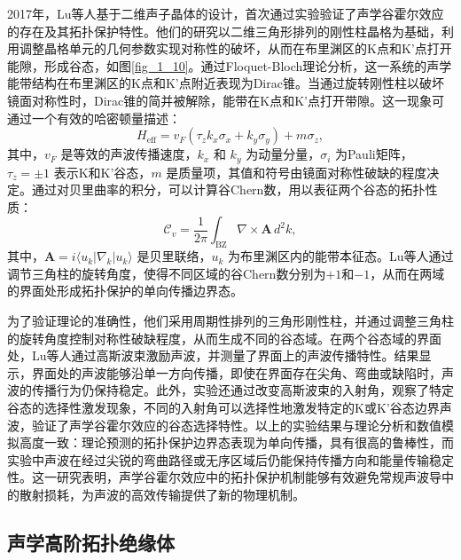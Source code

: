 2017年，Lu等人基于二维声子晶体的设计，首次通过实验验证了声学谷霍尔效应的存在及其拓扑保护特性\cite{i3}。他们的研究以二维三角形排列的刚性柱晶格为基础，利用调整晶格单元的几何参数实现对称性的破坏，从而在布里渊区的K点和K'点打开能隙，形成谷态，如图\ref{fig_1_10}。通过Floquet-Bloch理论分析，这一系统的声学能带结构在布里渊区的K点和K'点附近表现为Dirac锥。当通过旋转刚性柱以破坏镜面对称性时，Dirac锥的简并被解除，能带在K点和K'点打开带隙。这一现象可通过一个有效的哈密顿量描述：
\begin{equation} \label{eq1-13}
    H_{\text{eff}} = v_F (\tau_z k_x \sigma_x + k_y \sigma_y) + m \sigma_z,
\end{equation}
其中，\(v_F\) 是等效的声波传播速度，\(k_x\) 和 \(k_y\) 为动量分量，\(\sigma_i\) 为Pauli矩阵，\(\tau_z = \pm 1\) 表示K和K'谷态，\(m\) 是质量项，其值和符号由镜面对称性破缺的程度决定。通过对贝里曲率的积分，可以计算谷Chern数，用以表征两个谷态的拓扑性质：
\begin{equation} \label{eq1-14}
    \mathcal{C}_v = \frac{1}{2\pi} \int_{\text{BZ}} \nabla \times \mathbf{A} \, d^2k,
\end{equation}
其中，\(\mathbf{A} = i \langle u_k | \nabla_k | u_k \rangle\) 是贝里联络，\(u_k\) 为布里渊区内的能带本征态。Lu等人通过调节三角柱的旋转角度，使得不同区域的谷Chern数分别为\(+1\)和\(-1\)，从而在两域的界面处形成拓扑保护的单向传播边界态。

为了验证理论的准确性，他们采用周期性排列的三角形刚性柱，并通过调整三角柱的旋转角度控制对称性破缺程度，从而生成不同的谷态域。在两个谷态域的界面处，Lu等人通过高斯波束激励声波，并测量了界面上的声波传播特性。结果显示，界面处的声波能够沿单一方向传播，即使在界面存在尖角、弯曲或缺陷时，声波的传播行为仍保持稳定。此外，实验还通过改变高斯波束的入射角，观察了特定谷态的选择性激发现象，不同的入射角可以选择性地激发特定的K或K'谷态边界声波，验证了声学谷霍尔效应的谷态选择特性。以上的实验结果与理论分析和数值模拟高度一致：理论预测的拓扑保护边界态表现为单向传播，具有很高的鲁棒性，而实验中声波在经过尖锐的弯曲路径或无序区域后仍能保持传播方向和能量传输稳定性。这一研究表明，声学谷霍尔效应中的拓扑保护机制能够有效避免常规声波导中的散射损耗，为声波的高效传输提供了新的物理机制。

\subsection{声学高阶拓扑绝缘体}

